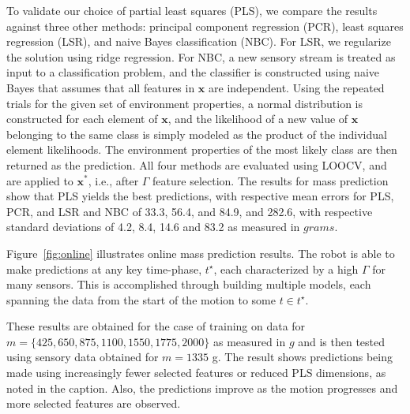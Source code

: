 To validate our choice of partial least squares (PLS), we compare the results against three other methods:  principal component regression (PCR), least squares regression (LSR), and naive Bayes classification (NBC).
For LSR, we regularize the solution using ridge regression.
For NBC, a new sensory stream is treated as input to a classification problem, and the classifier is constructed using naive Bayes that assumes that all features in $\mathbf{x}$ are independent.
Using the repeated trials for the given set of environment properties, a normal distribution is constructed for each element of $\mathbf{x}$, and the likelihood of a new value of $\mathbf{x}$ belonging to the same class is simply modeled as the product of the individual element likelihoods.
The environment properties of the most likely class are then returned as the prediction.
All four methods are evaluated using LOOCV, and are applied to $\mathbf{x^*}$, i.e., after $\Gamma$ feature selection.
The results for mass prediction show that PLS yields the best predictions, with respective mean errors for PLS, PCR, and LSR and NBC of 33.3, 56.4, and 84.9, and 282.6, 
with respective standard deviations of 4.2, 8.4, 14.6 and 83.2 as measured in $grams$.


Figure~\ref{fig:online} illustrates online mass prediction results. The robot is able to make predictions at any key time-phase, $t^{\star}$, each characterized by a high $\Gamma$ for many sensors. This is accomplished through building multiple models, each spanning the data from the start of the motion to some $t \in t^{\star}$.

These results are obtained for the case of training on data for $m = \{425, 650, 875, 1100, 1550, 1775, 2000\}$ as measured in $g$ and is then tested using sensory data obtained for $m=1335$ g.
The result shows predictions being made using increasingly fewer selected features or reduced PLS dimensions, as noted in the caption.
Also, the predictions improve as the motion progresses and more selected features are observed.  

